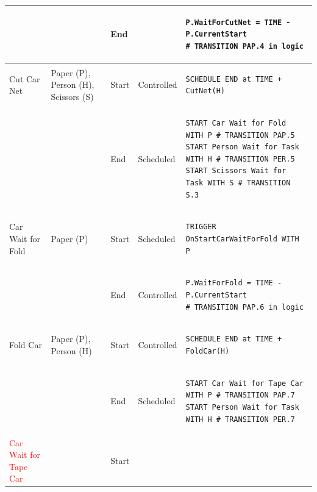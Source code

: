 \documentclass[
  10pt,
  a4paperpaper,
  DIV=11,
  numbers=noendperiod,
  oneside]{scrreprt}
\begin{document}
\begin{longtable}{@{}>{\raggedright\arraybackslash}p{1.8cm}>{\raggedright\arraybackslash}p{2.1cm}>{\raggedright\arraybackslash}p{0.9cm}>{\raggedright\arraybackslash}p{2.2cm}>{\raggedright\arraybackslash}p{8.75cm}@{}}
  &                                                          & End   &  & 
\begin{lstlisting}[language=CMPseudo]
P.WaitForCutNet = TIME - P.CurrentStart
# TRANSITION PAP.4 in logic
\end{lstlisting}             \\ \midrule
  Cut Car Net               & Paper (P), Person (H), Scissors (S)     & Start & Controlled  & 
\begin{lstlisting}[language=CMPseudo]
SCHEDULE END at TIME + CutNet(H)
\end{lstlisting}             \\
  &                                                          & End   & Scheduled &
\begin{lstlisting}[language=CMPseudo]
START Car Wait for Fold WITH P # TRANSITION PAP.5
START Person Wait for Task WITH H # TRANSITION PER.5
START Scissors Wait for Task WITH S # TRANSITION S.3
\end{lstlisting}              \\ \midrule
  Car Wait for Fold         & Paper (P)                              & Start & Scheduled  & 
\begin{lstlisting}[language=CMPseudo]
TRIGGER OnStartCarWaitForFold WITH P
\end{lstlisting}             \\
  &                                                          & End   & Controlled & 
\begin{lstlisting}[language=CMPseudo]
P.WaitForFold = TIME - P.CurrentStart
# TRANSITION PAP.6 in logic
\end{lstlisting}             \\ \midrule
  Fold Car                  & Paper (P), Person (H)                  & Start & Controlled  & 
\begin{lstlisting}[language=CMPseudo]
SCHEDULE END at TIME + FoldCar(H)
\end{lstlisting}             \\
  &                                                          & End   & Scheduled & 
\begin{lstlisting}[language=CMPseudo]
START Car Wait for Tape Car WITH P # TRANSITION PAP.7
START Person Wait for Task WITH H # TRANSITION PER.7
\end{lstlisting}             \\ \midrule
  \textcolor{red}{Car Wait for Tape Car}     &                                & Start &   & 
\begin{lstlisting}[language=CMPseudo]
 

\end{lstlisting}
\end{longtable}
\end{document}
